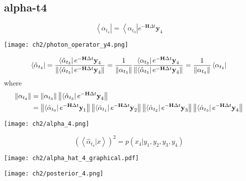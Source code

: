 \subsection{alpha-t4}
\begin{definition}
\begin{equation}
        \left< \alpha_{t_4} \right| = \left< \alpha_{t_3} \right| e^{-\textbf{H}\Delta t} \textbf{y}_4
\end{equation}
\begin{center}
        \texttt{[image: ch2/photon\_operator\_y4.png]}   
\end{center}
\begin{equation}
        \left< \hat{\alpha}_{t_4} \right| 
	= \frac{\left< \hat{\alpha}_{t_3} \right| e^{-\textbf{H}\Delta t} \textbf{y}_4}{\left\lVert\left< \hat{\alpha}_{t_3} \right| e^{-\textbf{H}\Delta t} \textbf{y}_4\right\rVert} 
        = \frac{1}{\left\lVert\alpha_{t_{3}}\right\rVert} \frac{\left< \alpha_{t_3} \right| e^{-\textbf{H}\Delta t} \textbf{y}_4}{\left\lVert\left< \hat{\alpha}_{t_3} \right| e^{-\textbf{H}\Delta t} \textbf{y}_4\right\rVert} 
        = \frac{1}{\left\lVert\alpha_{t_4}\right\rVert} \left< \alpha_{t_4} \right|
\end{equation}
where
\begin{equation}
\begin{split}
        \left\lVert\alpha_{t_4}\right\rVert &= \left\lVert\alpha_{t_{3}}\right\rVert \left\lVert\left< \hat{\alpha}_{t_3} \right| e^{-\textbf{H}\Delta t} \textbf{y}_4\right\rVert\\
        &= \left\lVert\left< \hat{\alpha}_{t_{0}} \right| e^{-\textbf{H}\Delta t} \textbf{y}_1\right\rVert \left\lVert\left< \hat{\alpha}_{t_1} \right| e^{-\textbf{H}\Delta t} \textbf{y}_2\right\rVert \left\lVert\left < \hat{\alpha}_{t_{2}} \right| e^{-\textbf{H}\Delta t} \textbf{y}_3\right\rVert \left\lVert\left < \hat{\alpha}_{t_{3}} \right| e^{-\textbf{H}\Delta t} \textbf{y}_4\right\rVert
\end{split}
\label{eq:alphat4}
\end{equation}
\begin{center}
        \texttt{[image: ch2/alpha\_4.png]}
\end{center}
\end{definition}

\begin{definition}[$p(x_4|\textbf{y})$]
\begin{equation}
        \left(\left<  \hat{\alpha}_{t_4} | x \right>\right)^2 = p(x_4|y_1,y_2,y_3,y_4)
\end{equation}
\begin{center}
        \texttt{[image: ch2/alpha\_hat\_4\_graphical.pdf]}
\end{center}
\begin{center}
        \texttt{[image: ch2/posterior\_4.png]}
\end{center}       
\end{definition}

